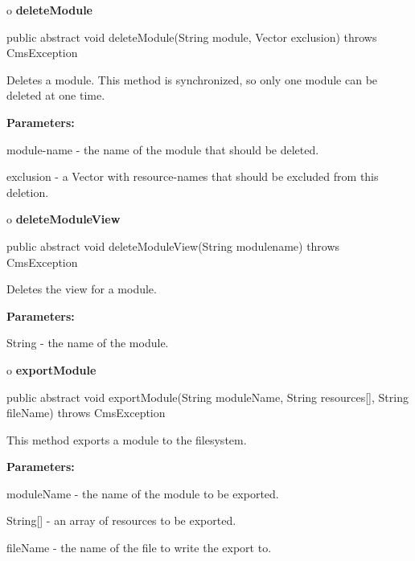 o {\bf deleteModule} 

\begin{PRE}
 public abstract void deleteModule(String module,
                                   Vector exclusion) throws CmsException
\end{PRE}

\begin{description}
\htmlDD Deletes a module. This method is synchronized, so only one module can
be deleted at one time. 

\begin{description}
\item {\bf Parameters:}  

module-name - the name of the module that should be deleted.  

exclusion - a Vector with resource-names that should be excluded from this
deletion.  
\end{description}

\end{description}

o {\bf deleteModuleView} 

\begin{PRE}
 public abstract void deleteModuleView(String modulename) throws CmsException
\end{PRE}

\begin{description}
\htmlDD Deletes the view for a module. 

\begin{description}
\item {\bf Parameters:}  

String - the name of the module.  
\end{description}

\end{description}

o {\bf exportModule} 

\begin{PRE}
 public abstract void exportModule(String moduleName,
                                   String resources[],
                                   String fileName) throws CmsException
\end{PRE}

\begin{description}
\htmlDD This method exports a module to the filesystem. 

\begin{description}
\item {\bf Parameters:}  

moduleName - the name of the module to be exported.  

String[] - an array of resources to be exported.  

fileName - the name of the file to write the export to.  
\end{description}

\end{description}

